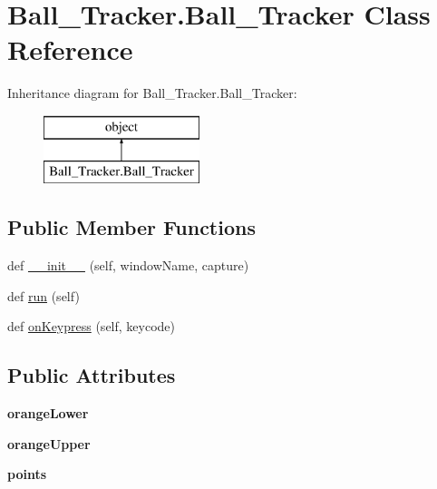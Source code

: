 \hypertarget{classBall__Tracker_1_1Ball__Tracker}{}\section{Ball\+\_\+\+Tracker.\+Ball\+\_\+\+Tracker Class Reference}
\label{classBall__Tracker_1_1Ball__Tracker}
Inheritance diagram for Ball\+\_\+\+Tracker.\+Ball\+\_\+\+Tracker\+:\begin{figure}[H]
\begin{center}
\leavevmode
\includegraphics[height=2.000000cm]{classBall__Tracker_1_1Ball__Tracker}
\end{center}
\end{figure}
\subsection*{Public Member Functions}
\begin{DoxyCompactItemize}
\item 
def \hyperlink{classBall__Tracker_1_1Ball__Tracker_a9f52b5e12bec7868ae835e57cb4a2eb4}{\+\_\+\+\_\+init\+\_\+\+\_\+} (self, window\+Name, capture)
\item 
def \hyperlink{classBall__Tracker_1_1Ball__Tracker_a836189dde622b6c508895dc113e4bbc1}{run} (self)
\item 
def \hyperlink{classBall__Tracker_1_1Ball__Tracker_a7defc81aec0000c97a325487dd57ee5c}{on\+Keypress} (self, keycode)
\end{DoxyCompactItemize}
\subsection*{Public Attributes}
\begin{DoxyCompactItemize}
\item 
\mbox{\label{classBall__Tracker_1_1Ball__Tracker_a3845d70e848af0a54873b54758a40dbc}} 
{\bfseries orange\+Lower}
\item 
\mbox{\label{classBall__Tracker_1_1Ball__Tracker_a435ac75c122115cc1c10a1eb551327d2}} 
{\bfseries orange\+Upper}
\item 
\mbox{\label{classBall__Tracker_1_1Ball__Tracker_a4500869aebdcc924509e6c0832d2c8af}} 
{\bfseries points}
\end{DoxyCompactItemize}



